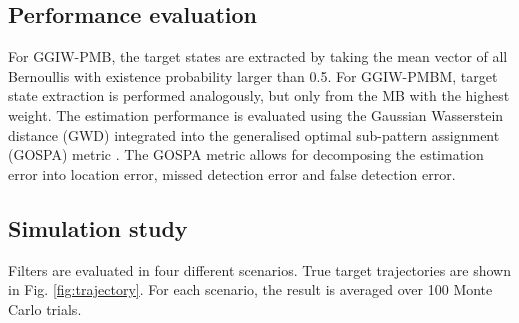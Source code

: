 \documentclass[journal]{IEEEtran}
\begin{document}
\subsection{Performance evaluation}
For GGIW-PMB, the target states are extracted by taking the mean vector of all Bernoullis with existence probability larger than 0.5. For GGIW-PMBM, target state extraction is performed analogously, but only from the MB with the highest weight. The estimation performance is evaluated using the Gaussian Wasserstein distance (GWD) \cite{gwd} integrated into the generalised optimal sub-pattern assignment (GOSPA) metric
\cite{gospa}. The GOSPA metric allows for decomposing the estimation error into location error, missed detection error and false detection error. 

\subsection{Simulation study}

Filters are evaluated in four different scenarios. True target trajectories are shown in Fig. \ref{fig:trajectory}. For each scenario, the result is averaged over 100 Monte Carlo trials.
\end{document}
